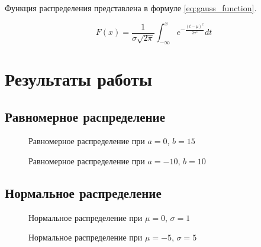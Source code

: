 Функция распределения представлена в формуле \ref{eq:gauss_function}.

\begin{equation}\label{eq:gauss_function}
    F (x) = \frac{1}{\sigma \sqrt{2\pi}} \int_{-\infty}^x e^{-\frac{(t- \mu)^2}{2 \sigma^2}} dt
\end{equation}

\chapter{Результаты работы}%

\section{Равномерное распределение}
\begin{figure}[H]
    \centering
    
    \caption{Равномерное распределение при $a = 0$, $b = 15$}%
\end{figure}
\begin{figure}[H]
    \centering
    
    \caption{Равномерное распределение при $a = -10$, $b = 10$}%
\end{figure}

\section{Нормальное распределение}
\begin{figure}[H]
    \centering
    
    \caption{Нормальное распределение при $\mu = 0$, $\sigma = 1$}%
\end{figure}
\begin{figure}[H]
    \centering
    
    \caption{Нормальное распределение при $\mu = -5$, $\sigma = 5$}%
\end{figure}
